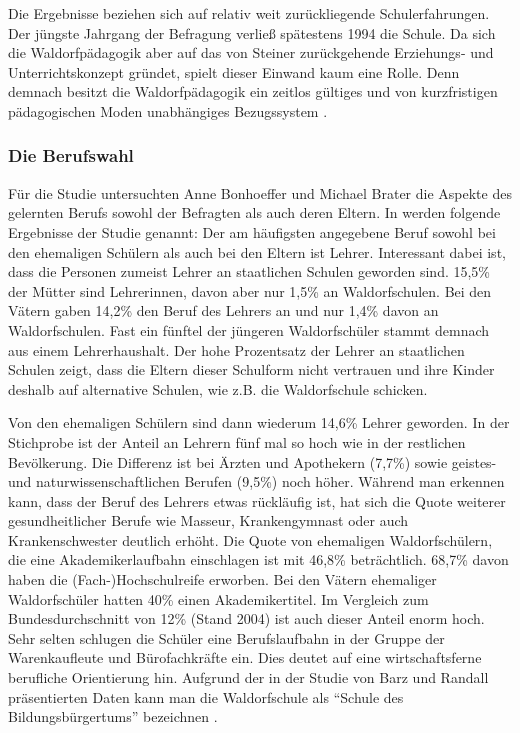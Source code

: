 
Die Ergebnisse beziehen sich auf relativ weit zurückliegende Schulerfahrungen. 
Der jüngste Jahrgang der Befragung verließ spätestens 1994 die Schule. 
Da sich die Waldorfpädagogik aber auf das von Steiner zurückgehende Erziehungs- und Unterrichtskonzept gründet, spielt dieser Einwand kaum eine Rolle. 
Denn demnach besitzt die Waldorfpädagogik ein zeitlos gültiges und von kurzfristigen pädagogischen Moden unabhängiges Bezugssystem \citep[vgl.][S. 16]{randoll07}.

\subsubsection{Die Berufswahl}
\label{subsub:Berufswahl}

Für die Studie untersuchten Anne Bonhoeffer und Michael Brater die Aspekte des gelernten Berufs sowohl der Befragten als auch deren Eltern. In \citet[][S. 16f]{randoll07} werden folgende Ergebnisse der Studie genannt: Der am häufigsten angegebene Beruf sowohl bei den ehemaligen Schülern als auch bei den Eltern ist Lehrer. Interessant dabei ist, dass die Personen zumeist Lehrer an staatlichen Schulen geworden sind. 
15,5\% der Mütter sind Lehrerinnen, davon aber nur 1,5\% an Waldorfschulen. Bei den Vätern gaben 14,2\% den Beruf des Lehrers an und nur 1,4\% davon an Waldorfschulen. Fast ein fünftel der jüngeren Waldorfschüler stammt demnach aus einem Lehrerhaushalt. Der hohe Prozentsatz der Lehrer an staatlichen Schulen zeigt, dass die Eltern dieser Schulform nicht vertrauen und ihre Kinder deshalb auf alternative Schulen, wie z.B. die Waldorfschule schicken.

Von den ehemaligen Schülern sind dann wiederum 14,6\% Lehrer geworden. 
In der Stichprobe ist der Anteil an Lehrern fünf mal so hoch wie in der restlichen Bevölkerung. 
Die Differenz ist bei Ärzten und Apothekern (7,7\%) sowie geistes- und naturwissenschaftlichen Berufen (9,5\%) noch höher. 
Während man erkennen kann, dass der Beruf des Lehrers etwas rückläufig ist, hat sich die Quote weiterer gesundheitlicher Berufe wie Masseur, Krankengymnast oder auch Krankenschwester deutlich erhöht. 
Die Quote von ehemaligen Waldorfschülern, die eine Akademikerlaufbahn einschlagen ist mit 46,8\% beträchtlich. 
68,7\% davon haben die (Fach-)Hochschulreife erworben. Bei den Vätern ehemaliger Waldorfschüler hatten 40\% einen Akademikertitel. 
Im Vergleich zum Bundesdurchschnitt von 12\% (Stand 2004) ist auch dieser Anteil enorm hoch. 
Sehr selten schlugen die Schüler eine Berufslaufbahn in der Gruppe der Warenkaufleute und Bürofachkräfte ein. 
Dies deutet auf eine wirtschaftsferne berufliche Orientierung hin. 
Aufgrund der in der Studie von Barz und Randall präsentierten Daten kann man die Waldorfschule als \enquote{Schule des Bildungsbürgertums} bezeichnen \citep[][S. 17]{randoll07}.

